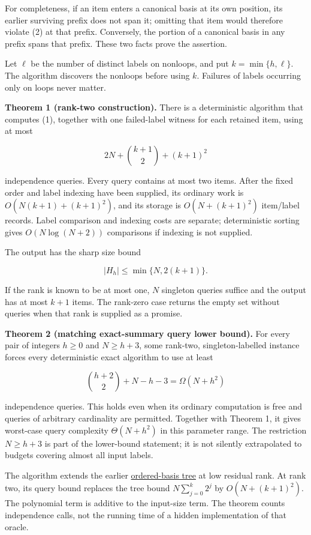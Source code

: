 For completeness, if an item enters a canonical basis at its own position, its earlier surviving prefix does not span it; omitting that item would therefore violate (2) at that prefix. Conversely, the portion of a canonical basis in any prefix spans that prefix. These two facts prove the assertion.

Let \(\ell\) be the number of distinct labels on nonloops, and put \(k=\min\{h,\ell\}\). The algorithm discovers the nonloops before using \(k\). Failures of labels occurring only on loops never matter.

\textbf{Theorem 1 (rank-two construction).} There is a deterministic algorithm that computes (1), together with one failed-label witness for each retained item, using at most

\[
2N+\binom{k+1}{2}+(k+1)^2
\tag{3}
\]

independence queries. Every query contains at most two items. After the fixed order and label indexing have been supplied, its ordinary work is \(O(N(k+1)+(k+1)^2)\), and its storage is \(O(N+(k+1)^2)\) item/label records. Label comparison and indexing costs are separate; deterministic sorting gives \(O(N\log(N+2))\) comparisons if indexing is not supplied.

The output has the sharp size bound

\[
|H_h|\le \min\{N,2(k+1)\}.
\tag{4}
\]

If the rank is known to be at most one, \(N\) singleton queries suffice and the output has at most \(k+1\) items. The rank-zero case returns the empty set without queries when that rank is supplied as a promise.

\textbf{Theorem 2 (matching exact-summary query lower bound).} For every pair of integers \(h\ge0\) and \(N\ge h+3\), some rank-two, singleton-labelled instance forces every deterministic exact algorithm to use at least

\[
\binom{h+2}{2}+N-h-3
=\Omega(N+h^2)
\tag{5}
\]

independence queries. This holds even when its ordinary computation is free and queries of arbitrary cardinality are permitted. Together with Theorem 1, it gives worst-case query complexity \(\Theta(N+h^2)\) in this parameter range. The restriction \(N\ge h+3\) is part of the lower-bound statement; it is not silently extrapolated to budgets covering almost all input labels.

The algorithm extends the earlier \href{https://github.com/icekylinx/algorithm-frontier/blob/main/problems/matroid-failure-summaries/manuscripts/weighted-oracle-prefix-fpt-construction.md}{ordered-basis tree} at low residual rank. At rank two, its query bound replaces the tree bound \(N\sum_{j=0}^{k}2^j\) by \(O(N+(k+1)^2)\). The polynomial term is additive to the input-size term. The theorem counts independence calls, not the running time of a hidden implementation of that oracle.

